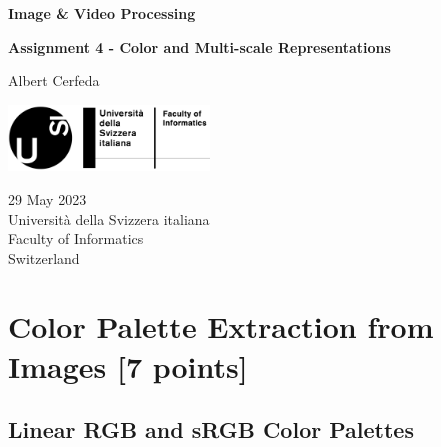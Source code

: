 \documentclass[tikz,14pt,fleqn]{article}
\newcommand\namesurname{Albert Cerfeda}
\newcommand\assignment{Assignment 4 - Color and Multi-scale Representations}
\newcommand\subject{Image \& Video Processing}
\newcommand\documentdate{29 May 2023}
\begin{document}
\begin{titlepage}
   \begin{center}
       \vspace*{0.2cm}

       \textbf{\Large{\subject}}

       \vspace{0.5cm}
        \textbf{\assignment}\\[5mm]
        
            
       \vspace{0.4cm}

        \namesurname
        \begin{figure}[H]
            \centering
        \end{figure}
       \tableofcontents

       \vspace*{\fill}
     
        \includegraphics[width=0.4\textwidth]{fig/logo.png}
       
        \documentdate \\
        Università della Svizzera italiana\\
        Faculty of Informatics\\
        Switzerland\\

   \end{center}
\end{titlepage}

\section{Color Palette Extraction from Images [7 points]}
\subsection{Linear RGB and sRGB Color Palettes}
\end{document}
